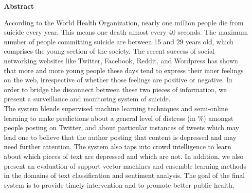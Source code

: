 
\clearemptydoublepage
{}
{}

\vspace*{2cm}
\begin{center}
{\Large \bf Abstract}
\end{center}
\vspace{1cm}

According to the World Health Organization, nearly one million people die from suicide every year. This means one death almost every 40 seconds. The maximum number of people committing suicide are between 15 and 29 years old, which comprises the young section of the society. The recent success of social networking websites like Twitter, Facebook, Reddit, and Wordpress has shown that more and more young people these days tend to express their inner feelings on the web, irrespective of whether those feelings are positive or negative. In order to bridge the disconnect between these two pieces of information, we present a surveillance and monitoring system of suicide.\\

The system blends supervised machine learning techniques and semi-online learning to make predictions about a general level of distress (in \%) amongst people posting on Twitter, and about particular instances of tweets which may lead one to believe that the author posting that content is depressed and may need further attention. The system also taps into crowd intelligence to learn about which pieces of text are depressed and which are not. In addition, we also present an evaluation of support vector machines and ensemble learning methods in the domains of text classification and sentiment analysis. The goal of the final system is to provide timely intervention and to promote better public health.

